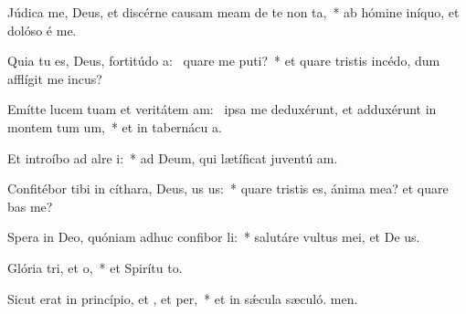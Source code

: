 \item Júdica me, Deus, et discérne causam meam de te non ta,~* ab hómine iníquo, et dolóso é me.
\item Quia tu es, Deus, fortitúdo a:~\pscross{} quare me puti?~* et quare tristis incédo, dum afflígit me incus?
\item Emítte lucem tuam et veritátem am:~\pscross{} ipsa me deduxérunt, et adduxérunt in montem tum um,~* et in tabernácu a.
\item Et introíbo ad alre i:~* ad Deum, qui lætíficat juventú am.
\item Confitébor tibi in cíthara, Deus, us us:~* quare tristis es, ánima mea? et quare bas me?
\item Spera in Deo, quóniam adhuc confibor li:~* salutáre vultus mei, et De us.
\item Glória tri, et o,~* et Spirítu to.
\item Sicut erat in princípio, et , et per,~* et in sǽcula sæculó. men.
